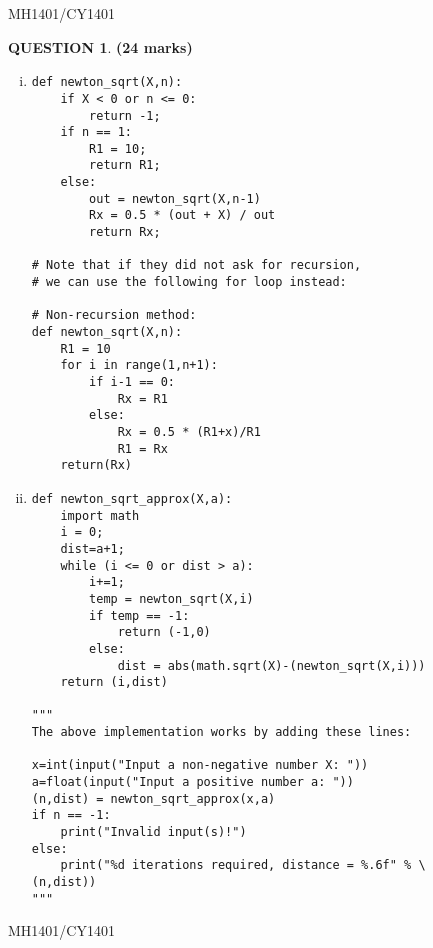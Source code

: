 \documentclass[a4paper,12pt]{article}
\theoremstyle{definition}
\newtheorem{ques}[dummy]{QUESTION}
\theoremstyle{plain}
\newcommand{\py}{python}
\begin{document}
\newpage
\hfill MH1401/CY1401\vspace*{0.5em}
\begin{ques}\hfill \textbf{(24 marks)}
	\begin{enumerate}[(i)]
		\item
		\begin{verbatim}
def newton_sqrt(X,n):
    if X < 0 or n <= 0:
        return -1;
    if n == 1:
        R1 = 10;
        return R1;
    else:
        out = newton_sqrt(X,n-1)
        Rx = 0.5 * (out + X) / out
        return Rx;		

# Note that if they did not ask for recursion,
# we can use the following for loop instead:

# Non-recursion method:
def newton_sqrt(X,n):
    R1 = 10
    for i in range(1,n+1):
        if i-1 == 0:
            Rx = R1
        else:
            Rx = 0.5 * (R1+x)/R1
            R1 = Rx
    return(Rx)
\end{verbatim}
\item
		\begin{verbatim}
def newton_sqrt_approx(X,a):
    import math
    i = 0;
    dist=a+1;
    while (i <= 0 or dist > a):
        i+=1;
        temp = newton_sqrt(X,i)
        if temp == -1:
            return (-1,0)
        else:
            dist = abs(math.sqrt(X)-(newton_sqrt(X,i)))
    return (i,dist)
    
"""
The above implementation works by adding these lines:

x=int(input("Input a non-negative number X: "))
a=float(input("Input a positive number a: "))
(n,dist) = newton_sqrt_approx(x,a)
if n == -1:
    print("Invalid input(s)!")
else:
    print("%d iterations required, distance = %.6f" % \ 
(n,dist))
"""
		\end{verbatim}
	\end{enumerate}
\end{ques}



\newpage

\hfill MH1401/CY1401\vspace*{0.5em}
\end{document}
